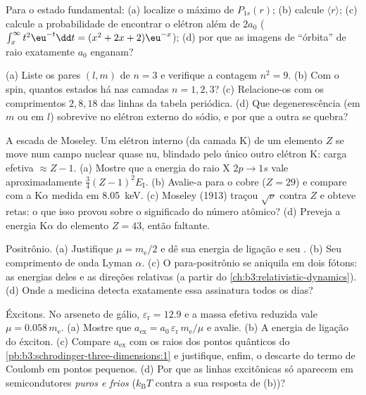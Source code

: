 \begin{exercise}[$\star$]\label{exo:b3:hydrogen-atom:3}
Para o estado fundamental: (a) localize o máximo de $P_{1s}(r)$; (b)
calcule $\langle r\rangle$; (c) calcule a probabilidade de encontrar o
elétron além de $2a_0$ ($\int_x^\infty t^2\eu^{-t}\dd t = (x^2 +
2x + 2)\eu^{-x}$); (d) por que as imagens de ``órbita'' de raio
exatamente $a_0$ enganam?
\end{exercise}

\begin{exercise}[$\star$]\label{exo:b3:hydrogen-atom:4}
(a) Liste os pares $(l, m)$ de $n = 3$ e verifique a contagem $n^2 =
9$. (b) Com o spin, quantos estados há nas camadas $n = 1, 2, 3$? (c)
Relacione-os com os comprimentos $2, 8, 18$ das linhas da tabela
periódica. (d) Que degenerescência (em $m$ ou em $l$) sobrevive no
elétron externo do sódio, e por que a outra se quebra?
\end{exercise}

\begin{exercise}[$\star\star$]\label{exo:b3:hydrogen-atom:5}
A escada de Moseley. Um elétron interno (da camada K) de um elemento
$Z$ se move num campo nuclear quase nu, blindado pelo único outro
elétron K: carga efetiva $\approx Z - 1$. (a) Mostre que a energia do
raio X $2p \to 1s$ vale aproximadamente
$\tfrac34(Z-1)^2E_{\text{I}}$. (b) Avalie-a para o cobre ($Z = 29$) e
compare com a K$\alpha$ medida em \qty{8.05}{keV}. (c) Moseley (1913)
traçou $\sqrt{\nu}$ contra $Z$ e obteve retas: o que isso provou sobre
o significado do número atômico? (d) Preveja a energia K$\alpha$ do
elemento $Z = 43$, então faltante.
\end{exercise}

\begin{exercise}[$\star\star$]\label{exo:b3:hydrogen-atom:6}
Positrônio. (a) Justifique $\mu = m_{\text{e}}/2$ e dê sua energia de
ligação e seu . (b) Seu comprimento de onda Lyman $\alpha$.
(c) O para-positrônio se aniquila em dois fótons: as energias deles e
as direções relativas (a partir do
\cref{ch:b3:relativistic-dynamics}). (d) Onde a medicina detecta
exatamente essa assinatura todos os dias?
\end{exercise}

\begin{exercise}[$\star\star$]\label{exo:b3:hydrogen-atom:7}
Éxcitons. No arseneto de gálio, $\varepsilon_{\text{r}} = 12.9$ e a
massa efetiva reduzida vale $\mu = 0.058\,m_{\text{e}}$. (a) Mostre que
$a_{\text{ex}} = a_0\,\varepsilon_{\text{r}}\,m_{\text{e}}/\mu$ e
avalie. (b) A energia de ligação do éxciton. (c) Compare
$a_{\text{ex}}$ com os raios dos pontos quânticos do
\cref{pb:b3:schrodinger-three-dimensions:1} e justifique, enfim, o
descarte do termo de Coulomb em pontos pequenos. (d) Por que as linhas
excitônicas só aparecem em semicondutores \emph{puros e frios}
($k_{\text{B}}T$ contra a sua resposta de (b))?
\end{exercise}

